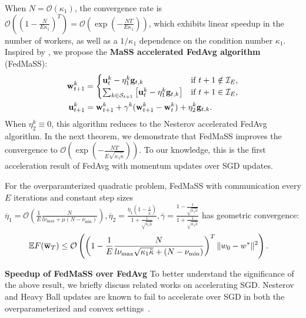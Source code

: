 When $N=\mathcal{O}(\kappa_{1})$, the convergence rate is $\mathcal{O}((1-\frac{N}{E\kappa_{1}})^{T})=\mathcal{O}(\exp(-\frac{NT}{E\kappa_{1}}))$,
which exhibits linear speedup in the number of workers, as well as
a $1/\kappa_{1}$ dependence on the condition number $\kappa_{1}$.
Inspired by \cite{liu2018accelerating}, we propose the \textbf{MaSS
	accelerated FedAvg algorithm} (FedMaSS):
\begin{align*}
\mathbf{w}_{t+1}^{k} & =\begin{cases}
\mathbf{u}_{t}^{k}-\eta_{1}^{k}\mathbf{g}_{t,k} & \text{if }t+1\notin\mathcal{I}_{E},\\
\sum_{k \in {\mathcal{S}}_{t+1}}\left[\mathbf{u}_{t}^{k}-\eta_{1}^{k}\mathbf{g}_{t,k}\right] & \text{if }t+1\in\mathcal{I}_{E},
\end{cases}\\
\mathbf{u}_{t+1}^{k} & =\mathbf{w}_{t+1}^{k}+\gamma^{k}(\mathbf{w}_{t+1}^{k}-\mathbf{w}_{t}^{k})+\eta_{2}^{k}\mathbf{g}_{t,k}. 
\end{align*}
When $\eta_{2}^{k}\equiv0$, this algorithm reduces to the Nesterov
accelerated FedAvg algorithm. In the next theorem, we demonstrate
that FedMaSS improves the convergence to $\mathcal{O}(\exp(-\frac{NT}{E\sqrt{\kappa_{1}\tilde{\kappa}}}))$.
To our knowledge, this is the first acceleration result of
FedAvg with momentum updates over SGD updates.
\begin{theorem}
	\label{thm:overparameterized_MaSS}For the overparamterized quadratic
	problem, FedMaSS with communication every $E$ iterations and constant
	step sizes $\overline{\eta}_1=\mathcal{O}(\frac{1}{E}\frac{N}{l\nu_{\max}+\mu(N-\nu_{\min})}),\overline{\eta}_{2}=\frac{\overline{\eta}_{1}(1-\frac{1}{\tilde{\kappa}})}{1+\frac{1}{\sqrt{\kappa_{1}\tilde{\kappa}}}},\overline{\gamma}=\frac{1-\frac{1}{\sqrt{\kappa_{1}\tilde{\kappa}}}}{1+\frac{1}{\sqrt{\kappa_{1}\tilde{\kappa}}}}$
	has geometric convergence:
	\begin{align*}
	\mathbb{E}F(\overline{{\mathbf{w}}}_{T}) & \leq\mathcal{O}\left(\left(1-\frac{1}{E}\frac{N}{l\nu_{\max}\sqrt{\kappa_{1}\tilde{\kappa}}+(N-\nu_{\min})}\right)^{T}\|w_{0}-w^{\ast}\|^{2}\right).
	\end{align*}
\end{theorem}
\textbf{Speedup of FedMaSS over FedAvg} 
To better understand the significance of the above result, we briefly discuss related works on accelerating SGD.
Nesterov and Heavy Ball updates are known to fail to accelerate over SGD in both the overparameterized
and convex settings~\cite{liu2018accelerating,kidambi2018insufficiency,liu2018toward,yuan2016influence}.
